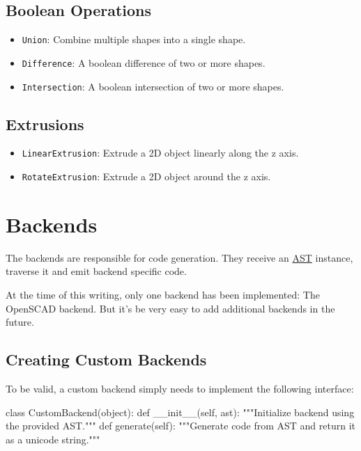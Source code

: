 \subsection{Boolean Operations}

\begin{itemize}
	\item \texttt{Union}: Combine multiple shapes into a single shape.
	\item \texttt{Difference}: A boolean difference of two or more shapes.
	\item \texttt{Intersection}: A boolean intersection of two or more shapes.
\end{itemize}

\subsection{Extrusions}

\begin{itemize}
	\item \texttt{LinearExtrusion}: Extrude a 2D object linearly along the z axis.
	\item \texttt{RotateExtrusion}: Extrude a 2D object around the z axis. 
\end{itemize}


\section{Backends}\label{sec:backends}

The backends are responsible for code generation. They receive an
\hyperref[sec:ast]{AST} instance, traverse it and emit backend specific code.

At the time of this writing, only one backend has been implemented: The OpenSCAD
backend. But it's be very easy to add additional backends in the future.

\subsection{Creating Custom Backends}

To be valid, a custom backend simply needs to implement the following interface:

\vspace{.5\baselineskip}

\begin{pythoncode}
class CustomBackend(object):
    def __init__(self, ast):
        """Initialize backend using the provided AST."""
    def generate(self):
        """Generate code from AST and return it
        as a unicode string."""
\end{pythoncode}

